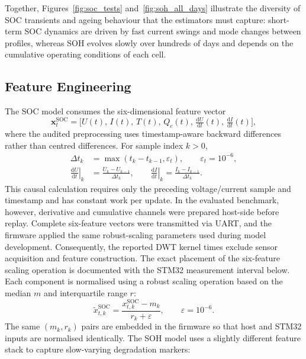 \documentclass[review]{elsarticle}
\begin{document}
\noindent
Together, Figures~\ref{fig:soc_tests} and~\ref{fig:soh_all_days} illustrate the diversity of SOC transients and ageing behaviour that the estimators must capture: short-term SOC dynamics are driven by fast current swings and mode changes between profiles, whereas SOH evolves slowly over hundreds of days and depends on the cumulative operating conditions of each cell.
\subsection{Feature Engineering}
The SOC model consumes the six-dimensional feature vector
\begin{equation}
    \mathbf{x}^{\mathrm{SOC}}_t = \bigl[U(t),\, I(t),\, T(t),\, Q_c(t),\, \tfrac{\mathrm{d}U}{\mathrm{d}t}(t),\, \tfrac{\mathrm{d}I}{\mathrm{d}t}(t)\bigr],
\end{equation}
where the audited preprocessing uses timestamp-aware backward differences rather than centred differences. For sample index $k>0$,
\begin{align}
    \Delta t_k &= \max(t_k-t_{k-1},\varepsilon_t), \qquad \varepsilon_t=10^{-6},\label{eq:feature_dt}\\
    \left.\frac{\mathrm{d}U}{\mathrm{d}t}\right|_k &= \frac{U_k-U_{k-1}}{\Delta t_k}, \qquad
    \left.\frac{\mathrm{d}I}{\mathrm{d}t}\right|_k = \frac{I_k-I_{k-1}}{\Delta t_k}.\label{eq:feature_backward_difference}
\end{align}
This causal calculation requires only the preceding voltage/current sample and timestamp and has constant work per update. In the evaluated benchmark, however, derivative and cumulative channels were prepared host-side before replay. Complete six-feature vectors were transmitted via UART, and the firmware applied the same robust-scaling parameters used during model development. Consequently, the reported DWT kernel times exclude sensor acquisition and feature construction. The exact placement of the six-feature scaling operation is documented with the STM32 measurement interval below. Each component is normalised using a robust scaling operation based on the median $m$ and interquartile range $r$:
\begin{equation}
    \tilde{x}^{\mathrm{SOC}}_{t,k} = \frac{x^{\mathrm{SOC}}_{t,k} - m_k}{r_k + \varepsilon}, \qquad \varepsilon=10^{-6}.
\end{equation}
The same $(m_k,r_k)$ pairs are embedded in the firmware so that host and STM32 inputs are normalised identically.
The SOH model uses a slightly different feature stack to capture slow-varying degradation markers:
\end{document}

